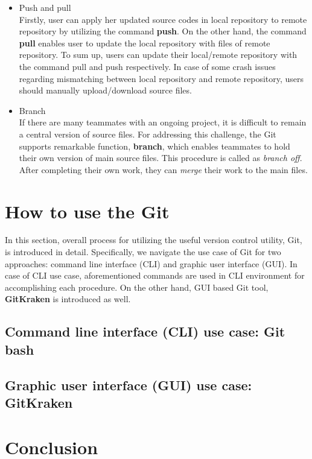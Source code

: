 \documentclass{article}
\begin{document}
\begin{itemize}
    \item Push and pull \\
    \hspace*{1mm} Firstly, user can apply her updated source codes in local repository to remote repository by utilizing the command \textbf{push}. On the other hand, the command \textbf{pull} enables user to update the local repository with files of remote repository. To sum up, users can update their local/remote repository with the command pull and push respectively. In case of some crash issues regarding mismatching between local repository and remote repository, users should manually upload/download source files.
    
    \item Branch \\
    \hspace*{1mm} If there are many teammates with an ongoing project, it is difficult to remain a central version of source files. For addressing this challenge, the Git supports remarkable function, \textbf{branch}, which enables teammates to hold their own version of main source files. This procedure is called as \textit{branch off}. After completing their own work, they can \textit{merge} their work to the main files.

\end{itemize}

\section{How to use the Git}
In this section, overall process for utilizing the useful version control utility, Git, is introduced in detail. Specifically, we navigate the use case of Git for two approaches: command line interface (CLI) and graphic user interface (GUI). In case of CLI use case, aforementioned commands are used in CLI environment for accomplishing each procedure. On the other hand, GUI based Git tool, \textbf{GitKraken} is introduced as well.

\subsection{Command line interface (CLI) use case: Git bash}

\subsection{Graphic user interface (GUI) use case: GitKraken}

\section{Conclusion}
% 
\end{document}
